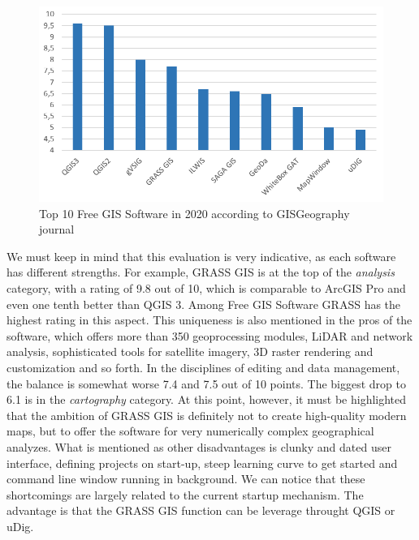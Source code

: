 \documentclass[a4paper,10pt,twoside]{article}
\begin{document}
\vspace{0.3cm}
\begin{figure}[hbt!] 
\begin{center}
\includegraphics[width=13cm]{../pictures/hodnoceni_free.png} 
\caption[Top 10 Free GIS Software in 2020 according to GISGeography journal]{Top 10 Free GIS Software in 2020 according to GISGeography journal}
\label{fig:hodnoceni_free}
\end{center}
\end{figure}

We must keep in mind that this evaluation is very indicative, as each software has different strengths. For example, GRASS GIS is at the top of the \textit{analysis} category, with a rating of 9.8 out of 10, which is comparable to ArcGIS Pro and even one tenth better than QGIS 3. Among Free GIS Software GRASS has the highest rating in this aspect. This uniqueness is also mentioned in the pros of the software, which offers more than 350 geoprocessing modules, LiDAR and network analysis, sophisticated tools for satellite imagery, 3D raster rendering and customization and so forth. In the disciplines of editing and data management, the balance is somewhat worse 7.4 and 7.5 out of 10 points. The biggest drop to 6.1 is in the \textit{cartography} category. At this point, however, it must be highlighted that the ambition of GRASS GIS is definitely not to create high-quality modern maps, but to offer the software for very numerically complex geographical analyzes. What is mentioned as other disadvantages is clunky and dated user interface, defining projects on start-up, steep learning curve to get started and command line window running in background. We can notice that these shortcomings are largely related to the current startup mechanism. The advantage is that the GRASS GIS function can be leverage throught QGIS or uDig.\\
\end{document}
